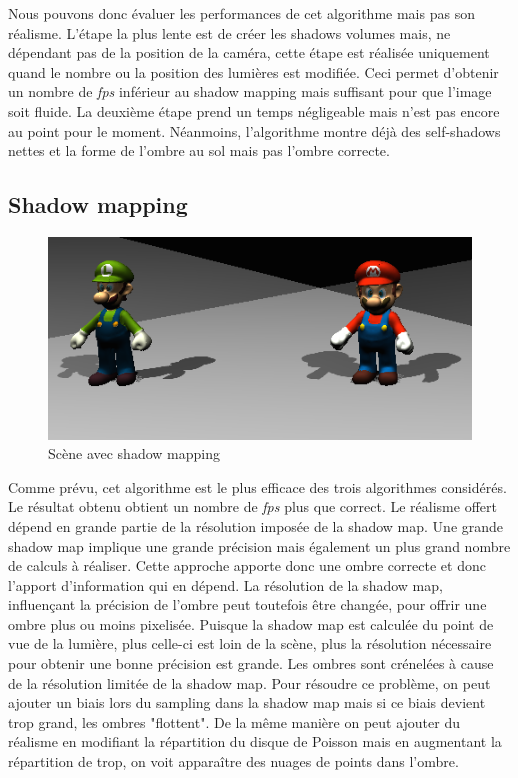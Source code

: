 \documentclass[a4paper,10pt]{report}
\begin{document}
Nous pouvons donc évaluer les performances de cet algorithme mais pas son réalisme.
L'étape la plus lente est de créer les shadows volumes mais, ne dépendant pas de la position de la caméra, cette étape est réalisée uniquement quand le nombre ou la position des lumières est modifiée.
Ceci permet d'obtenir un nombre de \textit{fps} inférieur au shadow mapping mais suffisant pour que l'image soit fluide.
La deuxième étape prend un temps négligeable mais n'est pas encore au point pour le moment. Néanmoins, l'algorithme montre déjà des self-shadows nettes et la forme de l'ombre au sol mais pas l'ombre correcte.



\subsection{Shadow mapping}

\begin{figure}[H]
\includegraphics[scale=0.4]{images/shadowmap.png}
\centering
\caption{Scène avec shadow mapping}
\end{figure}

Comme prévu, cet algorithme est le plus efficace des trois algorithmes considérés. Le résultat obtenu obtient un nombre de \textit{fps} plus que correct. Le réalisme offert dépend en grande partie de la résolution imposée de la shadow map. Une grande shadow map implique une grande précision mais également un plus grand nombre de calculs à réaliser. Cette approche apporte donc une ombre correcte et donc l'apport d'information qui en dépend. La résolution de la shadow map, influençant la précision de l'ombre peut toutefois être changée, pour offrir une ombre plus ou moins pixelisée. Puisque la shadow map est calculée du point de vue de la lumière, plus celle-ci est loin de la scène, plus la résolution nécessaire pour obtenir une bonne précision est grande.
Les ombres sont crénelées à cause de la résolution limitée de la shadow map. Pour résoudre ce problème, on peut ajouter un biais lors du sampling dans la shadow map mais si ce biais devient trop grand, les ombres "flottent".
De la même manière on peut ajouter du réalisme en modifiant la répartition du disque de Poisson mais en augmentant la répartition de trop, on voit apparaître des nuages de points dans l'ombre.
\end{document}
